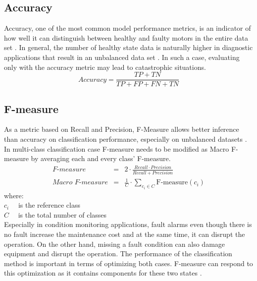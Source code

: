 \subsection{Accuracy}

Accuracy, one of the most common model performance metrics, is an indicator of how well it can distinguish between healthy and faulty motors in the entire data set \cite{grandini2020metrics}. In general, the number of healthy state data is naturally higher in diagnostic applications that result in an unbalanced data set \cite{han2021deep}. In such a case, evaluating only with the accuracy metric may lead to catastrophic situations. 
\begin{equation}
\textit{Accuracy} = \displaystyle\frac{TP + TN}{TP + FP + FN + TN} 
\label{accuracy}	
\end{equation}
\subsection{F-measure}
As a metric based on Recall and Precision, F-Measure allows better inference than accuracy on classification performance, especially on unbalanced datasets \cite{he2009learning}. In multi-class classification case F-measure needs to be modified as Macro F-measure by averaging each and every class' F-measure.
\begin{eqnarray}
\textit{F-measure} &=& 2\cdot\displaystyle\frac{Recall\cdot Precision}{Recall + Precision}\\
\textit{Macro F-measure} &=& \displaystyle\frac{1}{C}\cdot \displaystyle\sum_{c_{i} \in C}\text{F-measure}({c_i})
\label{fmeas}	
\end{eqnarray}
where:\\
$c_{i} \quad$ is the reference class \\
$C \quad$ is the total number of classes\\
Especially in condition monitoring applications, fault alarms even though there is no fault increase the maintenance cost and at the same time, it can disrupt the operation. On the other hand, missing a fault condition can also damage equipment and disrupt the operation. The performance of the classification method is important in terms of optimizing both cases. F-measure can respond to this optimization as it contains components for these two states \cite{janssens2016convolutional,seliya2009study}.
